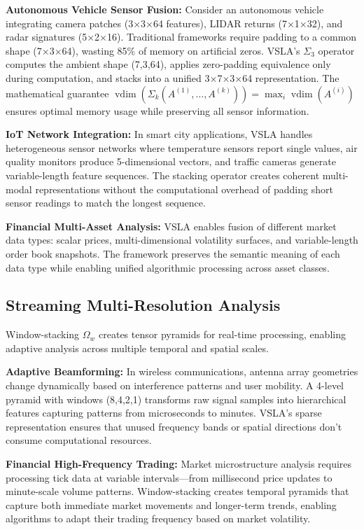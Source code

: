 \documentclass[11pt]{article}
\newcommand{\vdim}{\operatorname{vdim}}
\begin{document}
\textbf{Autonomous Vehicle Sensor Fusion:} Consider an autonomous vehicle integrating camera patches (3×3×64 features), LIDAR returns (7×1×32), and radar signatures (5×2×16). Traditional frameworks require padding to a common shape (7×3×64), wasting 85\% of memory on artificial zeros. VSLA's $\Sigma_3$ operator computes the ambient shape (7,3,64), applies zero-padding equivalence only during computation, and stacks into a unified 3×7×3×64 representation. The mathematical guarantee $\vdim(\Sigma_k(A^{(1)}, \ldots, A^{(k)})) = \max_i \vdim(A^{(i)})$ ensures optimal memory usage while preserving all sensor information.

\textbf{IoT Network Integration:} In smart city applications, VSLA handles heterogeneous sensor networks where temperature sensors report single values, air quality monitors produce 5-dimensional vectors, and traffic cameras generate variable-length feature sequences. The stacking operator creates coherent multi-modal representations without the computational overhead of padding short sensor readings to match the longest sequence.

\textbf{Financial Multi-Asset Analysis:} VSLA enables fusion of different market data types: scalar prices, multi-dimensional volatility surfaces, and variable-length order book snapshots. The framework preserves the semantic meaning of each data type while enabling unified algorithmic processing across asset classes.

\subsection{Streaming Multi-Resolution Analysis}

Window-stacking $\Omega_w$ creates tensor pyramids for real-time processing, enabling adaptive analysis across multiple temporal and spatial scales.

\textbf{Adaptive Beamforming:} In wireless communications, antenna array geometries change dynamically based on interference patterns and user mobility. A 4-level pyramid with windows (8,4,2,1) transforms raw signal samples into hierarchical features capturing patterns from microseconds to minutes. VSLA's sparse representation ensures that unused frequency bands or spatial directions don't consume computational resources.

\textbf{Financial High-Frequency Trading:} Market microstructure analysis requires processing tick data at variable intervals—from millisecond price updates to minute-scale volume patterns. Window-stacking creates temporal pyramids that capture both immediate market movements and longer-term trends, enabling algorithms to adapt their trading frequency based on market volatility.
\end{document}

